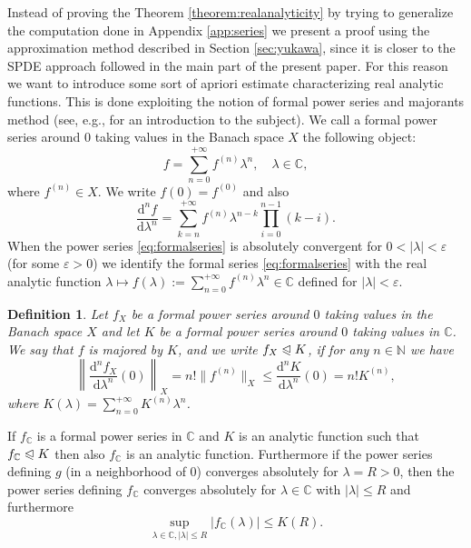 \documentclass{article}
\newcommand{\assign}{:=}
\newcommand{\mathd}{\mathrm{d}}
\newtheorem{definition}[theorem]{Definition}
\begin{document}
Instead of proving the Theorem \ref{theorem:realanalyticity} by trying to
generalize the computation done in Appendix \ref{app:series} we present a
proof using the approximation method described in Section \ref{sec:yukawa},
since it is closer to the SPDE approach followed in the main part of the
present paper. For this reason we want to introduce some sort of apriori
estimate characterizing real analytic functions. This is done exploiting the
notion of formal power series and majorants method (see, e.g.,
{\cite{Van2003}} for an introduction to the subject). We call a formal power
series around $0$ taking values in the Banach space $X$ the following object:
\begin{equation}
  f = \sum_{n = 0}^{+ \infty} f^{(n)} \lambda^n, \quad \lambda \in \mathbb{C},
  \label{eq:formalseries}
\end{equation}
where $f^{(n)} \in X$. We write $f (0) = f^{(0)}$ and also
\[ \frac{\mathd^n f}{\mathd \lambda^n} = \sum_{k = n}^{+ \infty} f^{(n)}
   \lambda^{n - k} \prod_{i = 0}^{n - 1} (k - i) . \]
When the power series {\eqref{eq:formalseries}} is absolutely convergent for
$0 < | \lambda | < \varepsilon$ (for some $\varepsilon > 0$) we identify the
formal series {\eqref{eq:formalseries}} with the real analytic function
$\lambda \mapsto f (\lambda) \assign \sum_{n = 0}^{+ \infty} f^{(n)} \lambda^n
\in \mathbb{C}$ defined for $| \lambda | < \varepsilon$.

\begin{definition}
  Let $f_X$ be a formal power series around $0$ taking values in the Banach
  space $X$ and let $K$ be a formal power series around $0$ taking values in
  $\mathbb{C}$. We say that $f$ is majored by $K$, and we write $f_X
  \trianglelefteqslant K$, if for any $n \in \mathbb{N}$ we have
  \[ \left\| \frac{\mathd^n f_X}{\mathd \lambda^n} (0) \right\|_X = n! \|
     f^{(n)} \|_X \leqslant \frac{\mathd^n K}{\mathd \lambda^n} (0) =
     n!K^{(n)}, \]
  where $K (\lambda) = \sum_{n = 0}^{+ \infty} K^{(n)} \lambda^n$.
\end{definition}

\begin{remark}
  \label{remark:seriesboundedness}If $f_{\mathbb{C}}$ is a formal power series
  in $\mathbb{C}$ and $K$ is an analytic function such that $f_{\mathbb{C}}
  \trianglelefteqslant K$ then also $f_{\mathbb{C}}$ is an analytic function.
  Furthermore if the power series defining $g$ (in a neighborhood of $0$)
  converges absolutely for $\lambda = R > 0$, then the power series defining
  $f_{\mathbb{C}}$ converges absolutely for $\lambda \in \mathbb{C}$ with $|
  \lambda | \leqslant R$ and furthermore
  \[ \sup_{\lambda \in \mathbb{C}, | \lambda | \leqslant R} | f_{\mathbb{C}}
     (\lambda) | \leqslant K (R) . \]
\end{remark}
\end{document}
